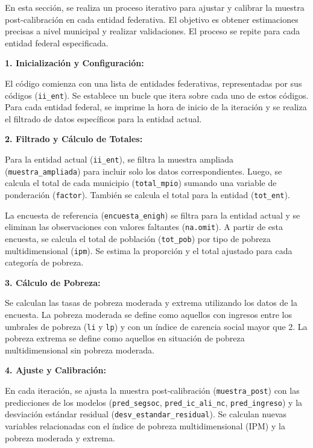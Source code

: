 \documentclass[
  12pt,
]{book}
\begin{document}
En esta sección, se realiza un proceso iterativo para ajustar y calibrar la muestra post-calibración en cada entidad federativa. El objetivo es obtener estimaciones precisas a nivel municipal y realizar validaciones. El proceso se repite para cada entidad federal especificada.

\textbf{1. Inicialización y Configuración:}

El código comienza con una lista de entidades federativas, representadas por sus códigos (\texttt{ii\_ent}). Se establece un bucle que itera sobre cada uno de estos códigos. Para cada entidad federal, se imprime la hora de inicio de la iteración y se realiza el filtrado de datos específicos para la entidad actual.

\textbf{2. Filtrado y Cálculo de Totales:}

Para la entidad actual (\texttt{ii\_ent}), se filtra la muestra ampliada (\texttt{muestra\_ampliada}) para incluir solo los datos correspondientes. Luego, se calcula el total de cada municipio (\texttt{total\_mpio}) sumando una variable de ponderación (\texttt{factor}). También se calcula el total para la entidad (\texttt{tot\_ent}).

La encuesta de referencia (\texttt{encuesta\_enigh}) se filtra para la entidad actual y se eliminan las observaciones con valores faltantes (\texttt{na.omit}). A partir de esta encuesta, se calcula el total de población (\texttt{tot\_pob}) por tipo de pobreza multidimensional (\texttt{ipm}). Se estima la proporción y el total ajustado para cada categoría de pobreza.

\textbf{3. Cálculo de Pobreza:}

Se calculan las tasas de pobreza moderada y extrema utilizando los datos de la encuesta. La pobreza moderada se define como aquellos con ingresos entre los umbrales de pobreza (\texttt{li} y \texttt{lp}) y con un índice de carencia social mayor que 2. La pobreza extrema se define como aquellos en situación de pobreza multidimensional sin pobreza moderada.

\textbf{4. Ajuste y Calibración:}

En cada iteración, se ajusta la muestra post-calibración (\texttt{muestra\_post}) con las predicciones de los modelos (\texttt{pred\_segsoc}, \texttt{pred\_ic\_ali\_nc}, \texttt{pred\_ingreso}) y la desviación estándar residual (\texttt{desv\_estandar\_residual}). Se calculan nuevas variables relacionadas con el índice de pobreza multidimensional (IPM) y la pobreza moderada y extrema.
\end{document}
